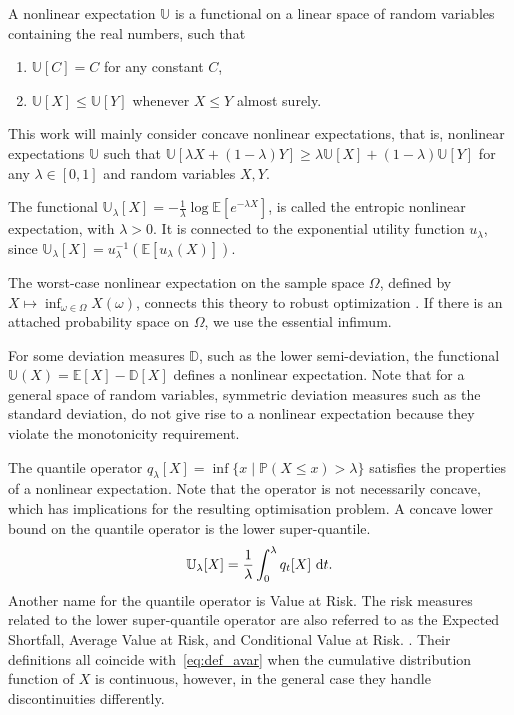 \documentclass[main.tex]{subfiles}
\begin{document}
\begin{mydef}
  A nonlinear expectation $\mathbb{U}$ is a functional on a linear space of random
  variables containing the real numbers, such that
  \begin{enumerate}
  \item $\mathbb{U}[C] = C$ for any constant $C$,
  \item $\mathbb{U}[X]\leq \mathbb{U}[Y]$ whenever $X\leq Y$ almost surely.
  \end{enumerate}
  This work will mainly consider concave nonlinear expectations, that
  is, nonlinear expectations $\mathbb{U}$ such that
  $\mathbb{U}[\lambda X + (1-\lambda)Y]\geq \lambda\mathbb{U}[X] +
  (1-\lambda) \mathbb{U}[Y]$ for any $\lambda\in[0,1]$ and random
  variables $X,Y$.
\end{mydef}

\begin{example}
  The functional $\mathbb{U}_\lambda[X]=-\frac{1}{\lambda}\log\mathbb
  E[e^{-\lambda X}]$, is called the entropic nonlinear expectation,
  with $\lambda>0$.
  It is connected to the exponential utility function $u_\lambda$, since
  $\mathbb{U}_\lambda[X]= u_\lambda^{-1}(\mathbb{E}[u_\lambda(X)])$.

  The worst-case nonlinear expectation on the sample space $\Omega$,
  defined by
  $X\mapsto  \inf_{\omega\in\Omega}X(\omega)$, connects this theory to robust
  optimization \citep{ben2009robust}. If there is an attached probability space on $\Omega$,
  we use the essential infimum.

  For some deviation measures $\mathbb{D}$, such as the lower
  semi-deviation, the functional $\mathbb{U}(X)=\mathbb{E}[X]-\mathbb
  D[X]$ defines a nonlinear expectation. Note that for a general space
  of random variables, symmetric deviation measures such as the
  standard deviation, do not give rise to a nonlinear
  expectation because they violate the monotonicity requirement.

  The quantile operator
  $q_\lambda[X] = \inf\{x\mid\mathbb{P}(X\leq x)>
  \lambda\}$ satisfies the properties of a nonlinear expectation.
  Note that the operator is not necessarily concave, which has
  implications for the resulting optimisation problem.
  A concave lower bound on the quantile operator is
  the lower super-quantile.
  \begin{equation}\label{eq:def_avar}
    \mathbb{U}_\lambda[X]=\frac{1}{\lambda}\int_0^\lambda q_t[X]\,\,\mathrm{d}t.
  \end{equation}
  Another name for the quantile operator is Value at Risk.
  The risk measures related to the lower super-quantile operator are also referred to as
  the Expected Shortfall, Average Value at Risk, and Conditional Value at Risk.
  \citep{artzner1999coherent,rockafellar2002conditional,follmer2004stochastic}.
  Their definitions all coincide with~\eqref{eq:def_avar} when the
  cumulative distribution function of $X$ is continuous, however, in
  the general case they handle discontinuities differently.
\end{example}
\end{document}
